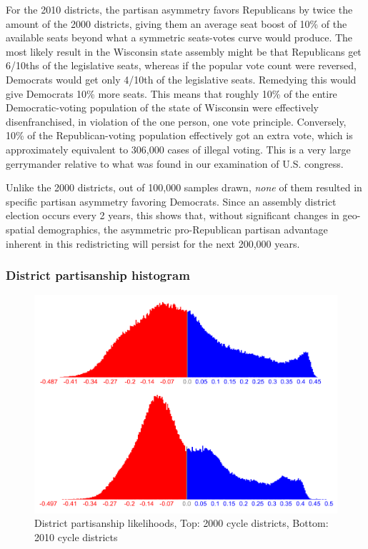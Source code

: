 \documentclass[preprint,12pt]{article}
\begin{document}
For the 2010 districts, the partisan asymmetry favors Republicans by twice the amount of the 2000 districts, giving them an average seat boost of 10\% of the available seats beyond what a symmetric seats-votes curve would produce.  
The most likely result in the Wisconsin state assembly might be that Republicans get 6/10ths of the legislative seats, whereas if the popular vote count were reversed, Democrats would get only 4/10th of the legislative seats.  
Remedying this would give Democrats 10\% more seats.  
This means that roughly 10\% of the entire Democratic-voting population of the state of Wisconsin were effectively disenfranchised, in violation of the one person, one vote principle.  
Conversely, 10\% of the Republican-voting population effectively got an extra vote, which is approximately equivalent to 306,000 cases of illegal voting.
This is a very large gerrymander relative to what was found in our examination of U.S. congress.

Unlike the 2000 districts, out of 100,000 samples drawn, \emph{none} of them resulted in specific partisan asymmetry favoring Democrats.  
Since an assembly district election occurs every 2 years, this shows that, without significant changes in geo-spatial demographics, the asymmetric pro-Republican partisan advantage inherent in this redistricting will persist for the next 200,000 years.

\subsubsection{District partisanship histogram}
  
\begin{figure}[htb!]
    \begin{center}
        \includegraphics[scale=0.25]{../Figures/WI_compared/district_partisanship_cropped.png}
        \caption{District partisanship likelihoods, Top: 2000 cycle districts, Bottom: 2010 cycle districts}\label{fig:LikelihoodsDistrictPartisanship}
    \end{center}
\end{figure}
\end{document}
